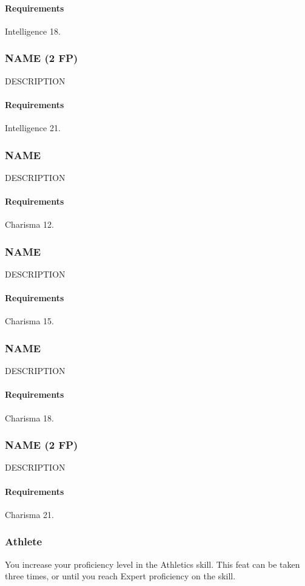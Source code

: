     \paragraph{Requirements} Intelligence 18.
\subsubsection{NAME (2 FP)} \label{feat::name}
    DESCRIPTION
    \paragraph{Requirements} Intelligence 21.
\subsubsection{NAME} \label{feat::name}
    DESCRIPTION
    \paragraph{Requirements} Charisma 12.
\subsubsection{NAME} \label{feat::name}
    DESCRIPTION
    \paragraph{Requirements} Charisma 15.
\subsubsection{NAME} \label{feat::name}
    DESCRIPTION
    \paragraph{Requirements} Charisma 18.
\subsubsection{NAME (2 FP)} \label{feat::name}
    DESCRIPTION
    \paragraph{Requirements} Charisma 21.
\subsubsection{Athlete} \label{feat::athlete}
    You increase your proficiency level in the Athletics skill.
    This feat can be taken three times, or until you reach Expert proficiency on the skill.
